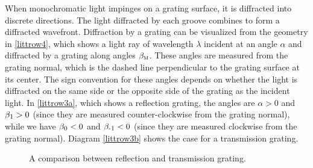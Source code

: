 When monochromatic light impinges on a grating surface, it is diffracted into discrete directions. The light diffracted by each groove combines to form a diffracted wavefront. Diffraction by a grating can be visualized from the geometry in \cref{littrow4}, which shows a light ray of wavelength $\lambda$ incident at an angle $\alpha$ and diffracted by a grating along angles $\beta_{\mbox{\footnotesize{\scshape{m}}}}$. These angles are measured from the grating normal, which is the dashed line perpendicular to the grating surface at its center. The sign convention for these angles depends on whether the light is diffracted on the same side or the opposite side of the grating as the incident light. In \cref{littrow3a}, which shows a reflection grating, the angles are  $\alpha>0$ and $\beta_{\mbox{\footnotesize{\scshape{1}}}}>0$ (since they are measured counter-clockwise from the grating normal), while we have $\beta_{\mbox{\footnotesize{\scshape{0}}}}<0$ and $\beta_{\mbox{\footnotesize{\scshape{-1}}}}<0$ (since they are measured clockwise from the grating normal). Diagram \cref{littrow3b} shows the case for a transmission grating.
\begin{figure}[!bht]\centering
{}
\hfill
{}
\caption{A comparison between reflection and transmission grating.}
\end{figure}

